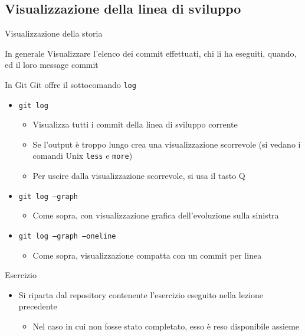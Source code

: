 \documentclass[xcolor=dvipsnames,presentation]{beamer}
\begin{document}
\subsection{Visualizzazione della linea di sviluppo}

\begin{frame}{Visualizzazione della storia}
    \begin{block}{In generale}
        Visualizzare l'elenco dei commit effettuati, chi li ha eseguiti, quando, ed il loro message commit
    \end{block}
    \begin{block}{In Git}
        Git offre il sottocomando \texttt{log}
        \begin{itemize}
            \item \texttt{git log}
            \begin{itemize}
                \item Visualizza tutti i commit della linea di sviluppo corrente
                \item Se l'output è troppo lungo crea una visualizzazione scorrevole (si vedano i comandi Unix \texttt{less} e \texttt{more})
                \item Per uscire dalla visualizzazione scorrevole, si usa il tasto Q
            \end{itemize}
            \item \texttt{git log --graph}
            \begin{itemize}
                \item Come sopra, con visualizzazione grafica dell'evoluzione sulla sinistra
            \end{itemize}
            \item \texttt{git log --graph --oneline}
            \begin{itemize}
                \item Come sopra, visualizzazione compatta con un commit per linea
            \end{itemize}
        \end{itemize}
    \end{block}
    \begin{block}{Esercizio}
        \begin{itemize}
            \item Si riparta dal repository contenente l'esercizio eseguito nella lezione precedente
            \begin{itemize}
                \item Nel caso in cui non fosse stato completato, esso è reso disponibile assieme

\end{itemize}
\end{itemize}
\end{block}
\end{frame}
\end{document}
